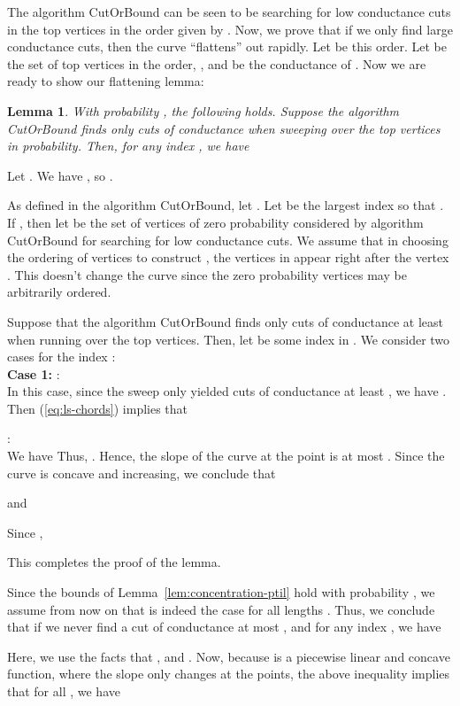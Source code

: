 \documentclass[11pt]{article}
\newtheorem{Lem}[theorem]{Lemma}
\newenvironment{myproof}{\noindent {\sc Proof:}}{}
\newcommand\CutOrBound{{\sc CutOrBound}\xspace}
\begin{document}
The algorithm \CutOrBound can be seen to be searching for low conductance cuts in the top  vertices in the order given by . Now, we prove that if we only find large conductance cuts, then the curve  ``flattens'' out rapidly. Let  be this order.
Let  be the set of top  vertices in the order, , and  be the conductance of . Now we are ready to show our flattening lemma:
\begin{Lem} \label{lem:ls-chords-empirical} With probability , the
following holds. Suppose the algorithm \CutOrBound finds only cuts of conductance  when sweeping over the top  vertices in  probability. Then, for any index , we have

\end{Lem}
\begin{myproof}
Let .
We have , so .

As defined in the algorithm \CutOrBound, let . Let  be the largest index so that . If , then let  be the set of  vertices  of zero  probability considered by algorithm \CutOrBound for searching for low conductance cuts. We assume that in choosing the ordering of vertices to construct , the vertices in  appear right after the vertex . This doesn't change the curve  since the zero  probability vertices may be arbitrarily ordered.


Suppose that the algorithm \CutOrBound finds only cuts of conductance at least
 when running over the top  vertices. Then, let  be some index in . We consider two cases for the index
:\\
{\bf Case 1:} :\\
In this case, since the sweep only yielded cuts of conductance at least , we have . Then (\ref{eq:ls-chords}) implies that


  :\\
We have
 Thus,
.
Hence, the slope of the curve  at the point 
is at most . Since the curve  is concave and
increasing, we conclude that

and

Since ,

This completes the proof of the lemma.
\end{myproof}


Since the bounds of Lemma~\ref{lem:concentration-ptil} hold with probability , we assume from now on that is indeed the case for all lengths . Thus, we conclude that if we never find a cut of conductance at most , and for any index , we have

Here, we use the facts that , and . Now, because  is a piecewise linear and concave
function, where the slope only changes at the  points, the above
inequality implies that for all , we have
\end{document}
